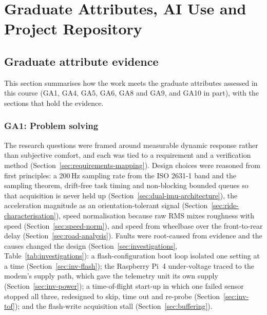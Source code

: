 \chapter{Graduate Attributes, AI Use and Project Repository}

\section{Graduate attribute evidence}
\label{app:ga}

This section summarises how the work meets the graduate attributes assessed in this course (GA1, GA4, GA5, GA6, GA8 and GA9, and GA10 in part), with the sections that hold the evidence.

\subsection*{GA1: Problem solving}
The research questions were framed around measurable dynamic response rather than subjective comfort, and each was tied to a requirement and a verification method (Section~\ref{sec:requirements-mapping}). Design choices were reasoned from first principles: a 200\,Hz sampling rate from the ISO 2631-1 band and the sampling theorem, drift-free task timing and non-blocking bounded queues so that acquisition is never held up (Section~\ref{sec:dual-imu-architecture}), the acceleration magnitude as an orientation-tolerant signal (Section~\ref{sec:ride-characterisation}), speed normalisation because raw RMS mixes roughness with speed (Section~\ref{sec:speed-norm}), and speed from wheelbase over the front-to-rear delay (Section~\ref{sec:road-analysis}). Faults were root-caused from evidence and the causes changed the design (Section~\ref{sec:investigations}, Table~\ref{tab:investigations}): a flash-configuration boot loop isolated one setting at a time (Section~\ref{sec:inv-flash}); the Raspberry Pi~4 under-voltage traced to the modem's supply path, which gave the telemetry unit its own supply (Section~\ref{sec:inv-power}); a time-of-flight start-up in which one failed sensor stopped all three, redesigned to skip, time out and re-probe (Section~\ref{sec:inv-tof}); and the flash-write acquisition stall (Section~\ref{sec:buffering}).


